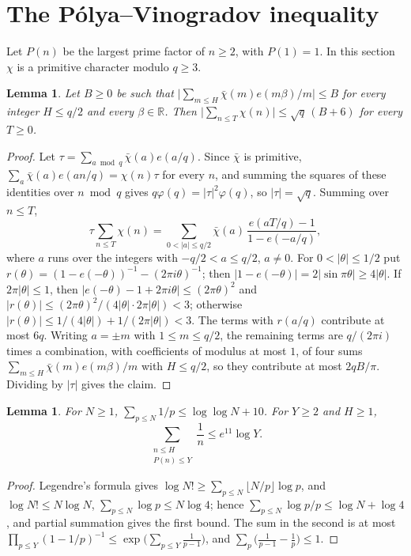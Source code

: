 \documentclass[12pt]{amsart}
\newtheorem{lemma}[theorem]{Lemma}
\theoremstyle{remark}
\newcommand{\R}{\mathbb{R}}
\begin{document}
\section{The P\'olya--Vinogradov inequality}\label{sec:pv}

Let $P(n)$ be the largest prime factor of $n\ge2$, with $P(1)=1$. In this section $\chi$ is a
primitive character modulo $q\ge3$.

\begin{lemma}\label{lem:polya}
Let $B\ge0$ be such that $\bigl|\sum_{m\le H}\bar\chi(m)e(m\beta)/m\bigr|\le B$ for every integer
$H\le q/2$ and every $\beta\in\R$. Then $\bigl|\sum_{n\le T}\chi(n)\bigr|\le\sqrt q\,(B+6)$ for every
$T\ge0$.
\end{lemma}

\begin{proof}
Let $\tau=\sum_{a\bmod q}\bar\chi(a)e(a/q)$. Since $\bar\chi$ is primitive,
$\sum_a\bar\chi(a)e(an/q)=\chi(n)\tau$ for every $n$, and summing the squares of these identities over
$n\bmod q$ gives $q\varphi(q)=|\tau|^2\varphi(q)$, so $|\tau|=\sqrt q$. Summing over $n\le T$,
\[
  \tau\sum_{n\le T}\chi(n)=\sum_{0<|a|\le q/2}\bar\chi(a)\,
  \frac{e(aT/q)-1}{1-e(-a/q)},
\]
where $a$ runs over the integers with $-q/2<a\le q/2$, $a\ne0$. For $0<|\theta|\le1/2$ put
$r(\theta)=(1-e(-\theta))^{-1}-(2\pi i\theta)^{-1}$; then $|1-e(-\theta)|=2|\sin\pi\theta|\ge4|\theta|$.
If $2\pi|\theta|\le1$, then $|e(-\theta)-1+2\pi i\theta|\le(2\pi\theta)^2$ and
$|r(\theta)|\le(2\pi\theta)^2/(4|\theta|\cdot2\pi|\theta|)<3$; otherwise
$|r(\theta)|\le1/(4|\theta|)+1/(2\pi|\theta|)<3$. The terms with $r(a/q)$ contribute at most
$6q$. Writing $a=\pm m$ with $1\le m\le q/2$, the remaining terms are $q/(2\pi i)$ times a
combination, with coefficients of modulus at most $1$, of four sums
$\sum_{m\le H}\bar\chi(m)e(m\beta)/m$ with $H\le q/2$, so they contribute at most $2qB/\pi$. Dividing
by $|\tau|$ gives the claim.
\end{proof}

\begin{lemma}\label{lem:smooth}
For $N\ge1$, $\sum_{p\le N}1/p\le\log\log N+10$. For $Y\ge2$ and $H\ge1$,
\[
  \sum_{\substack{n\le H\\P(n)\le Y}}\frac1n\le e^{11}\log Y.
\]
\end{lemma}

\begin{proof}
Legendre's formula gives $\log N!\ge\sum_{p\le N}\lfloor N/p\rfloor\log p$, and $\log N!\le N\log N$,
$\sum_{p\le N}\log p\le N\log4$; hence $\sum_{p\le N}\log p/p\le\log N+\log4$, and partial
summation gives the first bound. The sum in the second is at most
$\prod_{p\le Y}(1-1/p)^{-1}\le\exp\bigl(\sum_{p\le Y}\frac1{p-1}\bigr)$, and
$\sum_p\bigl(\frac1{p-1}-\frac1p\bigr)\le1$.
\end{proof}
\end{document}
